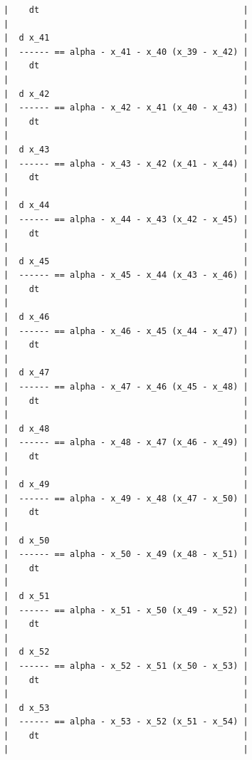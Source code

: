 {\begin{verbatim}
|    dt                                        |
|                                              |
|  d x_41                                      |
|  ------ == alpha - x_41 - x_40 (x_39 - x_42) |
|    dt                                        |
|                                              |
|  d x_42                                      |
|  ------ == alpha - x_42 - x_41 (x_40 - x_43) |
|    dt                                        |
|                                              |
|  d x_43                                      |
|  ------ == alpha - x_43 - x_42 (x_41 - x_44) |
|    dt                                        |
|                                              |
|  d x_44                                      |
|  ------ == alpha - x_44 - x_43 (x_42 - x_45) |
|    dt                                        |
|                                              |
|  d x_45                                      |
|  ------ == alpha - x_45 - x_44 (x_43 - x_46) |
|    dt                                        |
|                                              |
|  d x_46                                      |
|  ------ == alpha - x_46 - x_45 (x_44 - x_47) |
|    dt                                        |
|                                              |
|  d x_47                                      |
|  ------ == alpha - x_47 - x_46 (x_45 - x_48) |
|    dt                                        |
|                                              |
|  d x_48                                      |
|  ------ == alpha - x_48 - x_47 (x_46 - x_49) |
|    dt                                        |
|                                              |
|  d x_49                                      |
|  ------ == alpha - x_49 - x_48 (x_47 - x_50) |
|    dt                                        |
|                                              |
|  d x_50                                      |
|  ------ == alpha - x_50 - x_49 (x_48 - x_51) |
|    dt                                        |
|                                              |
|  d x_51                                      |
|  ------ == alpha - x_51 - x_50 (x_49 - x_52) |
|    dt                                        |
|                                              |
|  d x_52                                      |
|  ------ == alpha - x_52 - x_51 (x_50 - x_53) |
|    dt                                        |
|                                              |
|  d x_53                                      |
|  ------ == alpha - x_53 - x_52 (x_51 - x_54) |
|    dt                                        |
|                                              |

\end{verbatim}}
